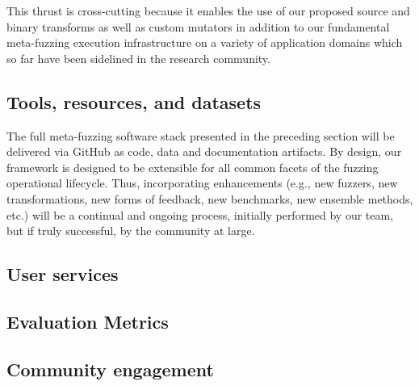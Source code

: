 This thrust is cross-cutting because it enables the use of our proposed source and binary 
transforms as well as custom mutators in addition to our fundamental meta-fuzzing execution
infrastructure on a variety of application domains which so far have been 
sidelined in the research community.

\subsection{Tools, resources, and datasets}
The full meta-fuzzing software stack presented in the preceding section will be delivered via GitHub as code, data and documentation artifacts. By design, our framework is designed to be extensible for all common facets of the fuzzing operational lifecycle. Thus, incorporating enhancements (e.g., new fuzzers, new transformations, new forms of feedback, new benchmarks, new ensemble methods, etc.) will be a continual and ongoing process, initially performed by our team, but if truly successful, by the community at large. 


\subsection{User services}
\label{sec:user-services}


\subsection{Evaluation Metrics}


\subsection{Community engagement}


